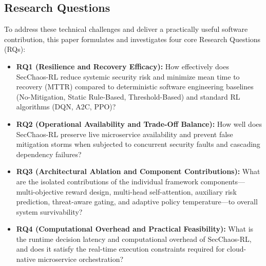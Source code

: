 \documentclass[ASNA,twocolumn]{USG}
\begin{document}
\subsection{Research Questions}
To address these technical challenges and deliver a practically useful software contribution, this paper formulates and investigates four core Research Questions (RQs):
\begin{itemize}
    \item \textbf{RQ1 (Resilience and Recovery Efficacy):} How effectively does SecChaos-RL reduce systemic security risk and minimize mean time to recovery (MTTR) compared to deterministic software engineering baselines (No-Mitigation, Static Rule-Based, Threshold-Based) and standard RL algorithms (DQN, A2C, PPO)?
    \item \textbf{RQ2 (Operational Availability and Trade-Off Balance):} How well does SecChaos-RL preserve live microservice availability and prevent false mitigation storms when subjected to concurrent security faults and cascading dependency failures?
    \item \textbf{RQ3 (Architectural Ablation and Component Contributions):} What are the isolated contributions of the individual framework components—multi-objective reward design, multi-head self-attention, auxiliary risk prediction, threat-aware gating, and adaptive policy temperature—to overall system survivability?
    \item \textbf{RQ4 (Computational Overhead and Practical Feasibility):} What is the runtime decision latency and computational overhead of SecChaos-RL, and does it satisfy the real-time execution constraints required for cloud-native microservice orchestration?
\end{itemize}
\end{document}
